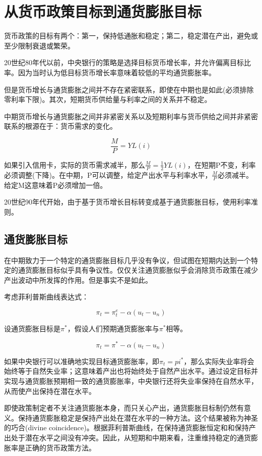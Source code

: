 \documentclass{article}
\begin{document}
\section{从货币政策目标到通货膨胀目标}

货币政策的目标有两个：第一，保持低通胀和稳定；第二，稳定潜在产出，避免或至少限制衰退或繁荣。

20世纪80年代以前，中央银行的策略是选择目标货币增长率，并允许偏离目标比率。因为当时认为低目标货币增长率意味着较低的平均通货膨胀率。

\hspace*{\fill}

但是货币增长与通货膨胀之间并不存在紧密联系，即使在中期也是如此(必须排除零利率下限)。其次，短期货币供给量与利率之间的关系并不稳定。

中期货币增长与通货膨胀之间并非紧密关系以及短期利率与货币供给之间并非紧密联系的根源在于：货币需求的变化。

\[
\frac{M}{P}=YL(i)
\]

如果引入信用卡，实际的货币需求减半，那么$ \frac{M}{P}=\frac{1}{2}YL(i) $，在短期P不变，利率必须调整(下降)。在中期，P可以调整，给定产出水平与利率水平，$ \frac{M}{P} $必须减半。给定M这意味着P必须增加一倍。

20世纪90年代开始，由于基于货币增长目标转变成基于通货膨胀目标，使用利率准则。

\subsection{通货膨胀目标}

在中期致力于一个特定的通货膨胀目标几乎没有争议，但试图在短期内达到一个特定的通货膨胀目标似乎具有争议性。仅仅关注通货膨胀似乎会消除货币政策在减少产出波动中所发挥的作用。但是事实不是如此。

考虑菲利普斯曲线表达式：

\[
\pi_t=\pi_t^e-\alpha(u_t-u_n)
\]

设通货膨胀目标是$ \pi^* $，假设人们预期通货膨胀率与$ \pi^* $相等。

\[
\pi_t=\pi^*-\alpha(u_t-u_n)
\]

如果中央银行可以准确地实现目标通货膨胀率，即$ \pi_t=pi^* $，那么实际失业率将会始终等于自然失业率；这意味着产出也将始终处于自然产出水平。通过设定目标并实现与通货膨胀预期相一致的通货膨胀率，中央银行还将失业率保持在自然水平，从而使产出保持在潜在水平。

即使政策制定者不关注通货膨胀本身，而只关心产出，通货膨胀目标制仍然有意义。保持通货膨胀稳定是保持产出处在潜在水平的一种方法。这个结果被称为神圣的巧合(divine coincidence)。根据菲利普斯曲线，在保持通货膨胀恒定和和保持产出处于潜在水平之间没有冲突。因此，从短期和中期来看，注重维持稳定的通货膨胀率是正确的货币政策方法。
\end{document}
